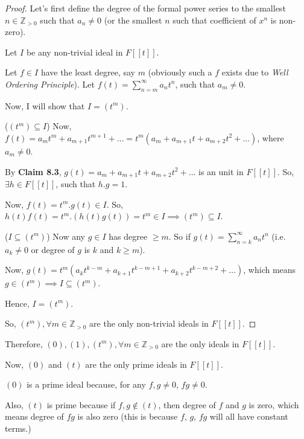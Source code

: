 \documentclass[12pt,a4paper]{article}
\theoremstyle{definition}
\begin{document}
\begin{flushleft}
\begin{proof}
	Let's first define the degree of the formal power series to the smallest $n \in \mathbb{Z}_{>0}$ such that $a_n \ne 0$ (or the smallest $n$ such that coefficient of $x^n$ is non-zero).

	\medskip

	Let $I$ be any non-trivial ideal in $F[[t]]$.

	Let $f \in I$ have the least degree, say $m$ (obviously such a $f$ exists due to {\it Well Ordering Principle}). Let $f(t) = \sum_{n=m}^{\infty} a_nt^n$, such that $a_m \ne 0$.

	Now, I will show that $I = (t^m)$.

	\medskip

	($(t^m) \subseteq I$) Now, $f(t) = a_mt^m + a_{m+1}t^{m+1} + \dots = t^m(a_m + a_{m+1}t + a_{m+2}t^2 + \dots)$, where $a_m \ne 0$.

	By {\bf Claim 8.3}, $g(t) = a_m + a_{m+1}t + a_{m+2}t^2 + \dots$ is an unit in $F[[t]]$. So, $\exists h \in F[[t]]$, such that $h.g=1$.

	Now, $f(t) = t^m.g(t) \in I$. So, $h(t)f(t) = t^m.(h(t) g(t)) = t^m \in I \implies (t^m) \subseteq I$.

	\medskip

	($I \subseteq (t^m)$) Now any $g \in I$ has degree $\ge m$. So if $g(t) = \sum_{n=k}^{\infty} a_nt^n$ (i.e. $a_k \ne 0$ or degree of $g$ is $k$ and $k \ge m$).

	Now, $g(t) = t^m(a_kt^{k-m} + a_{k+1}t^{k-m+1} + a_{k+2}t^{k-m+2} + \dots)$, which means $g \in (t^m) \implies I \subseteq (t^m)$.

	\medskip

	Hence, $I = (t^m)$.

	\medskip

	So, $(t^m),\forall m \in \mathbb{Z}_{>0}$ are the only non-trivial ideals in $F[[t]]$.
\end{proof}

Therefore, $(0), (1), (t^m),\forall m \in \mathbb{Z}_{>0}$ are the only ideals in $F[[t]]$.

\medskip

Now, $(0)$ and $(t)$ are the only prime ideals in $F[[t]]$. 

\medskip

$(0)$ is a prime ideal because, for any $f,g \ne 0$, $fg \ne 0$.

Also, $(t)$ is prime because if $f,g \notin (t)$, then degree of $f$ and $g$ is zero, which means degree of $fg$ is also zero (this is because $f$, $g$, $fg$ will all have constant terms.)


\end{flushleft}
\end{document}
